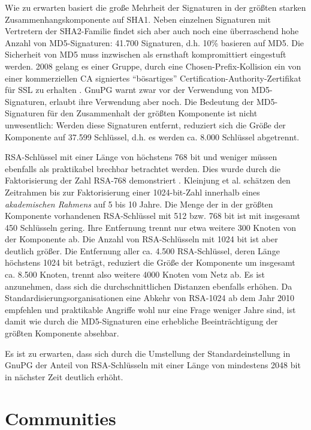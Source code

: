 Wie zu erwarten basiert die große Mehrheit der Signaturen in der
größten starken Zusammenhangskomponente auf SHA1. Neben einzelnen
Signaturen mit Vertretern der SHA2-Familie findet sich aber auch noch
eine überraschend hohe Anzahl von MD5-Signaturen: 41.700 Signaturen,
d.h. 10\% basieren auf MD5. Die Sicherheit von MD5 muss inzwischen als
ernsthaft kompromittiert eingestuft werden. 2008 gelang es einer
Gruppe, durch eine Chosen-Prefix-Kollision ein von einer kommerziellen
CA signiertes ``bösartiges'' Certification-Authority-Zertifikat
für SSL zu erhalten \cite{Stevens2009}. GnuPG warnt zwar vor der
Verwendung von MD5-Signaturen, erlaubt ihre Verwendung aber noch. Die
Bedeutung der MD5-Signaturen für den Zusammenhalt der größten
Komponente ist nicht unwesentlich: Werden diese Signaturen entfernt,
reduziert sich die Größe der Komponente auf 37.599 Schlüssel,
d.h. es werden ca. 8.000 Schlüssel abgetrennt. 

RSA-Schlüssel mit einer Länge von höchstens 768 bit und weniger
müssen ebenfalls als praktikabel brechbar betrachtet werden. Dies
wurde durch die Faktorisierung der Zahl RSA-768 demonstriert
\cite{Kleinjung2010}. Kleinjung et al. schätzen den Zeitrahmen bis
zur Faktorisierung einer 1024-bit-Zahl innerhalb eines
\emph{akademischen Rahmens} auf 5 bis 10 Jahre. Die Menge der in der
größten Komponente vorhandenen RSA-Schlüssel mit 512 bzw. 768 bit
ist mit insgesamt 450 Schlüsseln gering. Ihre Entfernung trennt nur
etwa weitere 300 Knoten von der Komponente ab. Die Anzahl von
RSA-Schlüsseln mit 1024 bit ist aber deutlich größer. Die
Entfernung aller ca. 4.500 RSA-Schlüssel, deren Länge höchstens
1024 bit beträgt, reduziert die Größe der Komponente um insgesamt
ca. 8.500 Knoten, trennt also weitere 4000 Knoten vom Netz ab. Es ist
anzunehmen, dass sich die durchschnittlichen Distanzen ebenfalls
erhöhen. Da Standardisierungsorganisationen eine Abkehr von RSA-1024
ab dem Jahr 2010 empfehlen \cite{NIST2007} und praktikable Angriffe
wohl nur eine Frage weniger Jahre sind, ist damit wie durch die
MD5-Signaturen eine erhebliche Beeinträchtigung der größten
Komponente absehbar.

Es ist zu erwarten, dass sich durch die Umstellung der
Standardeinstellung in GnuPG der Anteil von RSA-Schlüsseln mit
einer Länge von mindestens 2048 bit in nächster Zeit deutlich
erhöht.

\section{Communities}
\label{sec:result-zusamm-und-comm}


